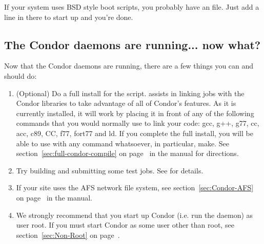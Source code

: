 If your system uses BSD style boot scripts, you probably have an
 file.  Just add a line in there to start up
 and you're done.


\subsection{The Condor daemons are running... now what?}

Now that the Condor daemons are running, there are a few things you
can and should do:

\begin{enumerate}
\item  (Optional) Do a full install for the  script.
     assists in linking jobs with the Condor libraries
    to take advantage of all of Condor's features.  As it is currently
    installed, it will work by placing it in front of any of the
    following commands that you would normally use to link your code:
    gcc, g++, g77, cc, acc, c89, CC, f77, fort77 and ld.  If you
    complete the full install, you will be able to use 
    with any command whatsoever, in particular, make. 
	See section~\ref{sec:full-condor-compile} on page~\pageref{sec:full-condor-compile} in the manual for directions.

\item  Try building and submitting some test jobs.  See 
    for details.

\item If your site uses the AFS network file system, see 
section~\ref{sec:Condor-AFS} on page~\pageref{sec:Condor-AFS} in the manual.

\item We strongly recommend that you start up Condor (i.e. run the
 daemon) as user root.  If you must start Condor as some
user other than root, see section~\ref{sec:Non-Root} on 
page~\pageref{sec:Non-Root}.

\end{enumerate}
